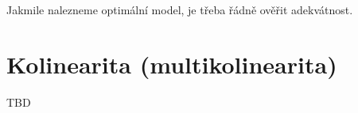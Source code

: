 \begin{remark}
	Jakmile nalezneme optimální model, je třeba řádně ověřit adekvátnost.
\end{remark}

\chapter{Kolinearita (multikolinearita)}
TBD